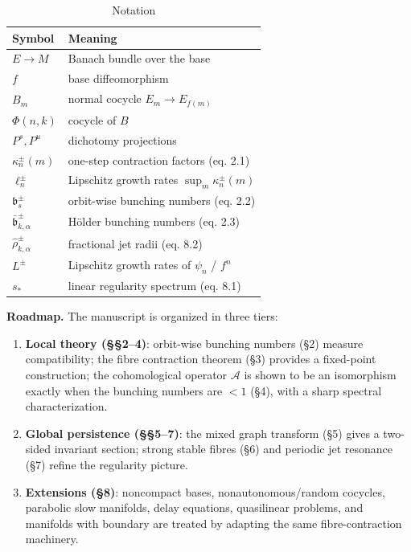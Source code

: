 \documentclass[11pt,a4paper]{article}
\theoremstyle{plain}
\theoremstyle{definition}
\theoremstyle{remark}
\numberwithin{equation}{section}
\numberwithin{figure}{section}
\begin{document}
\begin{table}[h]
\centering
\begin{tabularx}{\textwidth}{l X}
\toprule
Symbol & Meaning \\
\midrule
$E\to M$ & Banach bundle over the base \\
$f$ & base diffeomorphism \\
$B_m$ & normal cocycle $E_m\to E_{f(m)}$ \\
$\Phi(n,k)$ & cocycle of $B$ \\
$P^{s},P^{u}$ & dichotomy projections \\
$\kappa^\pm_n(m)$ & one-step contraction factors (eq. 2.1) \\
$\ell^\pm_n$ & Lipschitz growth rates $\sup_m\kappa^\pm_n(m)$ \\
$\mathfrak b^\pm_s$ & orbit-wise bunching numbers (eq. 2.2) \\
$\bar{\mathfrak b}^\pm_{k,\alpha}$ & Hölder bunching numbers (eq. 2.3) \\
$\widehat\rho^\pm_{k,\alpha}$ & fractional jet radii (eq. 8.2) \\
$L^\pm$ & Lipschitz growth rates of $\psi_n$ / $f^n$ \\
$s_*$ & linear regularity spectrum (eq. 8.1) \\
\bottomrule
\end{tabularx}
\caption{Notation}
\label{tab:notation}
\end{table}

\textbf{Roadmap.} The manuscript is organized in three tiers:

\begin{enumerate}
    \item \textbf{Local theory (§§2–4)}: orbit-wise bunching numbers (§2) measure compatibility; the fibre contraction theorem (§3) provides a fixed-point construction; the cohomological operator $\mathcal A$ is shown to be an isomorphism exactly when the bunching numbers are $<1$ (§4), with a sharp spectral characterization.
    \item \textbf{Global persistence (§§5–7)}: the mixed graph transform (§5) gives a two-sided invariant section; strong stable fibres (§6) and periodic jet resonance (§7) refine the regularity picture.
    \item \textbf{Extensions (§8)}: noncompact bases, nonautonomous/random cocycles, parabolic slow manifolds, delay equations, quasilinear problems, and manifolds with boundary are treated by adapting the same fibre-contraction machinery.
\end{enumerate}
\end{document}
